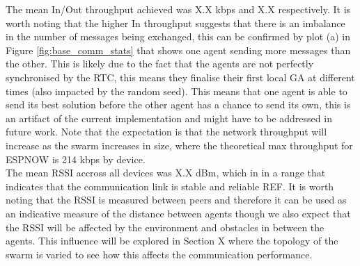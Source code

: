 \documentclass[conference]{IEEEtran}
\begin{document}
The mean In/Out throughput achieved was X.X kbps and X.X respectively. It is worth noting that the higher In throughput suggests that there is an imbalance in the number of messages being exchanged, this can be confirmed by plot (a) in Figure \ref{fig:base_comm_stats} that shows one agent sending more messages than the other. This is likely due to the fact that the agents are not perfectly synchronised by the RTC, this means they finalise their first local GA at different times (also impacted by the random seed). This means that one agent is able to send its best solution before the other agent has a chance to send its own, this is an artifact of the current implementation and might have to be addressed in future work. Note that the expectation is that the network throughput will increase as the swarm increases in size, where the theoretical max throughput for ESPNOW is 214 kbps by device.\\ 

The mean RSSI accross all devices was X.X dBm, which in in a range that indicates that the communication link is stable and reliable REF. It is worth noting that the RSSI is measured between peers and therefore it can be used as an indicative measure of the distance between agents though we also expect that the RSSI will be affected by the environment and obstacles in between the agents. This influence will be explored in Section X where the topology of the swarm is varied to see how this affects the communication performance.\\

\newpage
\printbibliography
\end{document}
